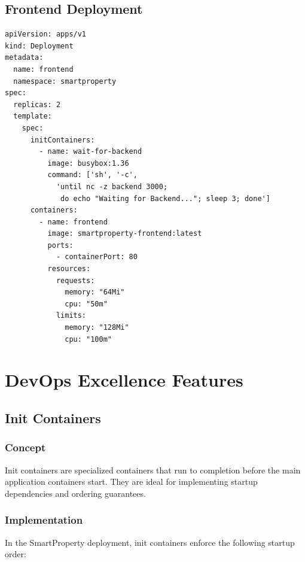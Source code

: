 \documentclass[12pt,a4paper]{report}
\begin{document}
\section{Frontend Deployment}

\begin{lstlisting}[style=yamlstyle, caption={Frontend Deployment with Init Container}]
apiVersion: apps/v1
kind: Deployment
metadata:
  name: frontend
  namespace: smartproperty
spec:
  replicas: 2
  template:
    spec:
      initContainers:
        - name: wait-for-backend
          image: busybox:1.36
          command: ['sh', '-c',
            'until nc -z backend 3000;
             do echo "Waiting for Backend..."; sleep 3; done']
      containers:
        - name: frontend
          image: smartproperty-frontend:latest
          ports:
            - containerPort: 80
          resources:
            requests:
              memory: "64Mi"
              cpu: "50m"
            limits:
              memory: "128Mi"
              cpu: "100m"
\end{lstlisting}

\chapter{DevOps Excellence Features}

\section{Init Containers}

\subsection{Concept}

Init containers are specialized containers that run to completion before the main application containers start. They are ideal for implementing startup dependencies and ordering guarantees.

\subsection{Implementation}

In the SmartProperty deployment, init containers enforce the following startup order:
\end{document}

